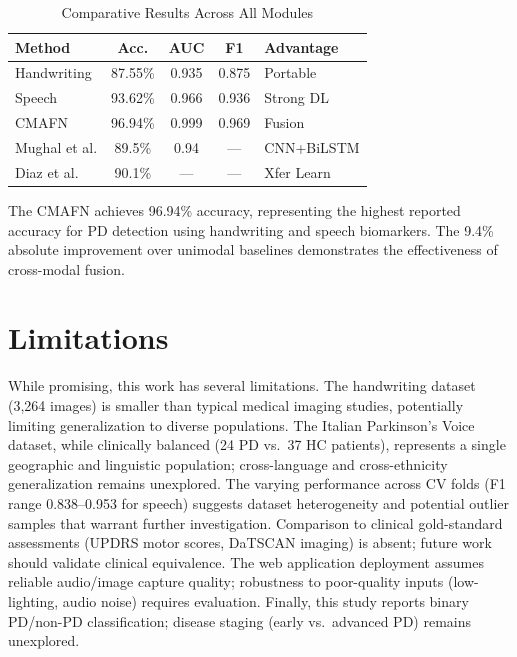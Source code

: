\documentclass[10pt,conference,letterpaper]{IEEEtran}
\begin{document}
\begin{table}[h]
\centering
\small
\caption{Comparative Results Across All Modules}
\label{tab:results}
\begin{tabular}{|l|c|c|c|p{2.5cm}|}
\hline
\textbf{Method} & \textbf{Acc.} & \textbf{AUC} & \textbf{F1} & \textbf{Advantage} \\
\hline
Handwriting & 87.55\% & 0.935 & 0.875 & Portable \\
\hline
Speech & 93.62\% & 0.966 & 0.936 & Strong DL \\
\hline
CMAFN & 96.94\% & 0.999 & 0.969 & Fusion \\
\hline
Mughal et al. & 89.5\% & 0.94 & --- & CNN+BiLSTM \\
\hline
Diaz et al. & 90.1\% & --- & --- & Xfer Learn \\
\hline
\end{tabular}
\end{table}

The CMAFN achieves 96.94\% accuracy, representing the highest reported accuracy for PD detection using handwriting and speech biomarkers. The 9.4\% absolute improvement over unimodal baselines demonstrates the effectiveness of cross-modal fusion.

\section{Limitations}

While promising, this work has several limitations. The handwriting dataset (3,264 images) is smaller than typical medical imaging studies, potentially limiting generalization to diverse populations. The Italian Parkinson's Voice dataset, while clinically balanced (24 PD vs.~37 HC patients), represents a single geographic and linguistic population; cross-language and cross-ethnicity generalization remains unexplored. The varying performance across CV folds (F1 range 0.838--0.953 for speech) suggests dataset heterogeneity and potential outlier samples that warrant further investigation. Comparison to clinical gold-standard assessments (UPDRS motor scores, DaTSCAN imaging) is absent; future work should validate clinical equivalence. The web application deployment assumes reliable audio/image capture quality; robustness to poor-quality inputs (low-lighting, audio noise) requires evaluation. Finally, this study reports binary PD/non-PD classification; disease staging (early vs.~advanced PD) remains unexplored.

\end{document}
